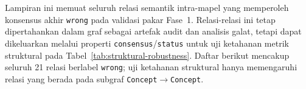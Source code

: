 \documentclass[../../thesis]{subfiles}
\begin{document}
\ifSubfilesClassLoaded{}{\appendix\setcounter{chapter}{9}}

\label{lamp:wrong-triples}

Lampiran ini memuat seluruh relasi semantik intra-mapel yang memperoleh
konsensus akhir \texttt{wrong} pada validasi pakar Fase~1. Relasi-relasi ini
tetap dipertahankan dalam graf sebagai artefak audit dan analisis galat, tetapi
dapat dikeluarkan melalui properti \texttt{consensus}/\texttt{status} untuk uji
ketahanan metrik struktural pada Tabel~\ref{tab:struktural-robustness}. Daftar
berikut mencakup seluruh 21 relasi berlabel \texttt{wrong}; uji ketahanan
struktural hanya memengaruhi relasi yang berada pada subgraf
\texttt{Concept}$\rightarrow$\texttt{Concept}.
\end{document}
